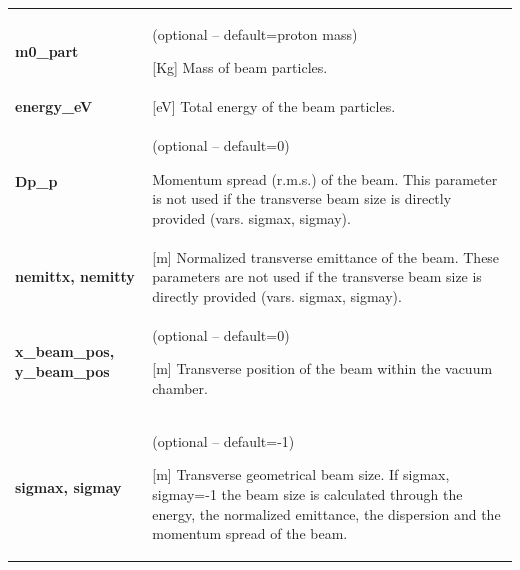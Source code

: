 \documentclass[a4paper,12pt]{article}
\begin{document}
\begin{longtable}{p{}p{}}
\hline\endfirsthead\hline\endhead\rowcolor{Gray}
\multicolumn{2}{p{.97\textwidth}}{
\textbf{Basic definitions}
}\\ \hline
\textbf{m0\_part}& 	(optional -- default=proton mass)

[Kg] Mass of beam particles. \\ \hline
\textbf{energy\_eV}& 	[eV] Total energy of the beam particles.\\ \hline
\textbf{Dp\_p}& 	(optional -- default=0)

Momentum spread (r.m.s.) of the beam. This parameter is not used if the transverse beam size is directly provided (vars. sigmax, sigmay).\\ \hline
\textbf{nemittx, nemitty}& 	[m] Normalized transverse emittance of the beam. These parameters are not used if the transverse beam size is directly provided (vars. sigmax, sigmay).\\ \hline
\textbf{x\_beam\_pos, y\_beam\_pos}& 	(optional -- default=0)

[m] Transverse position of the beam within the vacuum chamber.\\ \hline
\textbf{sigmax, sigmay}&	(optional -- default=-1)

[m] Transverse geometrical beam size. If sigmax, sigmay=-1 the beam size is calculated through the energy, the normalized emittance, the dispersion and the momentum spread of the beam.\\
\hline
\end{longtable}
\end{document}
